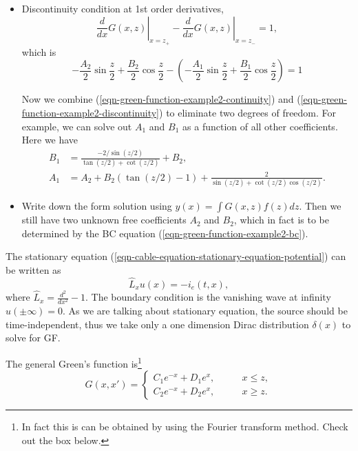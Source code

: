 \begin{framed}
\begin{itemize}
\item Discontinuity condition at 1st order derivatives,
\begin{equation*}
    \left.\frac{d}{dx} G(x,z)  \right\vert_{x=z_+} - \left.\frac{d}{dx} G(x,z)  \right\vert_{x=z_-} = 1, 
\end{equation*}
which is
\begin{equation}
    -\frac{A_2}{2}\sin\frac{z}{2} + \frac{B_2}{2} \cos\frac{z}{2} - \left( -\frac{A_1}{2}\sin\frac{z}{2} + \frac{B_1}{2}\cos\frac{z}{2} \right) = 1
    \label{eqn-green-function-example2-discontinuity}
\end{equation}

Now we combine (\ref{eqn-green-function-example2-continuity}) and (\ref{eqn-green-function-example2-discontinuity}) to eliminate two degrees of freedom. For example, we can solve out $A_1$ and $B_1$ as a function of all other coefficients. Here we have
\begin{align*}
    B_1 &= \frac{ - 2/\sin(z/2) }{\tan(z/2) + \cot(z/2)} + B_2 , \\
    A_1 &= A_2 + B_2(\tan(z/2)-1) + \frac{2}{\sin(z/2) + \cot(z/2)\cos(z/2)}.
\end{align*}

\item Write down the form solution using $y(x) = \int G(x,z) f(z) dz$. Then we still have two unknown free coefficients $A_2$ and $B_2$, which in fact is to be determined by the BC equation (\ref{eqn-green-function-example2-bc}).

\end{itemize}


\end{framed}



The stationary equation (\ref{eqn-cable-equation-stationary-equation-potential}) can be written as
\begin{equation}
    \hat L_x u(x) = - i_e(t,x),
\end{equation}
where $\hat L_x = \frac{d^2}{dx^2} -1$. The boundary condition is the vanishing wave at infinity $u(\pm\infty)=0$. As we are talking about stationary equation, the source should be time-independent, thus we take only a one dimension Dirac distribution $\delta(x)$ to solve for GF.

The general Green's function is\footnote{In fact this is can be obtained by using the Fourier transform method. Check out the box below.}
\begin{equation*}
G(x,x') = \begin{cases}
C_1 e^{-x} + D_1 e^{x}, & \qquad x\leq z,\\
C_2 e^{-x} + D_2 e^{x}, & \qquad x\geq z.
\end{cases}
\end{equation*}

